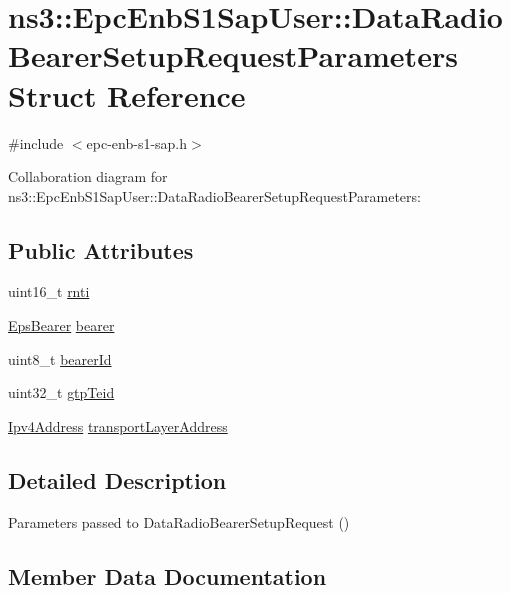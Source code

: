 \hypertarget{structns3_1_1EpcEnbS1SapUser_1_1DataRadioBearerSetupRequestParameters}{}\section{ns3\+:\+:Epc\+Enb\+S1\+Sap\+User\+:\+:Data\+Radio\+Bearer\+Setup\+Request\+Parameters Struct Reference}
\label{structns3_1_1EpcEnbS1SapUser_1_1DataRadioBearerSetupRequestParameters}


{\ttfamily \#include $<$epc-\/enb-\/s1-\/sap.\+h$>$}



Collaboration diagram for ns3\+:\+:Epc\+Enb\+S1\+Sap\+User\+:\+:Data\+Radio\+Bearer\+Setup\+Request\+Parameters\+:
\subsection*{Public Attributes}
\begin{DoxyCompactItemize}
\item 
uint16\+\_\+t \hyperlink{structns3_1_1EpcEnbS1SapUser_1_1DataRadioBearerSetupRequestParameters_a7e5dff79d4396915b8cf096270cbeb2e}{rnti}
\item 
\hyperlink{structns3_1_1EpsBearer}{Eps\+Bearer} \hyperlink{structns3_1_1EpcEnbS1SapUser_1_1DataRadioBearerSetupRequestParameters_a138e6101bd0a92ca0750e2aa8196e857}{bearer}
\item 
uint8\+\_\+t \hyperlink{structns3_1_1EpcEnbS1SapUser_1_1DataRadioBearerSetupRequestParameters_ae92dc0d09abc65e7a97c424093f4375f}{bearer\+Id}
\item 
uint32\+\_\+t \hyperlink{structns3_1_1EpcEnbS1SapUser_1_1DataRadioBearerSetupRequestParameters_aa6e1bfc9d1e935382399398ee1f788ac}{gtp\+Teid}
\item 
\hyperlink{classns3_1_1Ipv4Address}{Ipv4\+Address} \hyperlink{structns3_1_1EpcEnbS1SapUser_1_1DataRadioBearerSetupRequestParameters_af8739922a7cec5bf98f37837de18dcee}{transport\+Layer\+Address}
\end{DoxyCompactItemize}


\subsection{Detailed Description}
Parameters passed to Data\+Radio\+Bearer\+Setup\+Request () 

\subsection{Member Data Documentation}
